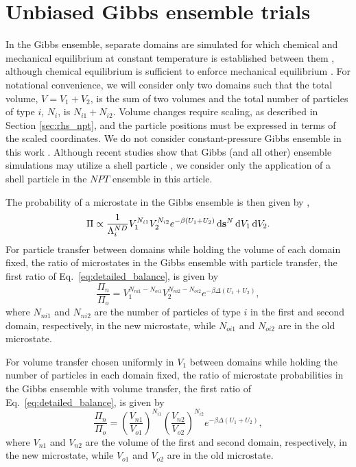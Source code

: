 \section{\label{sec:rhs_gibbs}Unbiased Gibbs ensemble trials}

In the Gibbs ensemble, separate domains are simulated for which chemical and mechanical equilibrium at constant temperature is established between them \cite{panagiotopoulos_direct_1987}, although chemical equilibrium is sufficient to enforce mechanical equilibrium \cite{panagiotopoulos_adsorption_1987}.
For notational convenience, we will consider only two domains such that the total volume, $V=V_1+V_2$, is the sum of two volumes and the total number of particles of type $i$, $N_i$, is $N_{i1} + N_{i2}$.
Volume changes require scaling, as described in Section \ref{sec:rhs_npt}, and the particle positions must be expressed in terms of the scaled coordinates.
We do not consider constant-pressure Gibbs ensemble in this work \cite{panagiotopoulos_phase_1988}.
Although recent studies show that Gibbs (and all other) ensemble simulations may utilize a shell particle \cite{hatch_theory_2024}, we consider only the application of a shell particle in the $NPT$ ensemble in this article.

The probability of a microstate in the Gibbs ensemble is then given by \cite{panagiotopoulos_direct_1987, frenkel_understanding_2002, hatch_theory_2024},
\begin{equation}
\Pi \propto \frac{1}{\Lambda_i^{ND}}V_1^{N_{i1}}V_2^{N_{i2}} e^{-\beta (U_1+U_2)} \mathop{}\!\mathrm{d}\mathbf{s}^{N} \mathop{}\!\mathrm{d} V_1 \mathop{}\!\mathrm{d} V_2.
\label{eq:rhs_gibbs_pi}
\end{equation}
For particle transfer between domains while holding the volume of each domain fixed, the ratio of microstates in the Gibbs ensemble with particle transfer, the first ratio of Eq.~\ref{eq:detailed_balance}, is given by
\begin{equation}
\frac{\Pi_{n}}{\Pi_{o}} = V_1^{N_{ni1}-N_{oi1}} V_2^{N_{ni2}-N_{oi2}}e^{-\beta\Delta (U_1+U_2)},
\label{eq:rhs_gibbs_particle}
\end{equation}
where $N_{ni1}$ and $N_{ni2}$ are the number of particles of type $i$ in the first and second domain, respectively, in the new microstate, while $N_{oi1}$ and $N_{oi2}$ are in the old microstate.

For volume transfer chosen uniformly in $V_1$ between domains while holding the number of particles in each domain fixed, the ratio of microstate probabilities in the Gibbs ensemble with volume transfer, the first ratio of Eq.~\ref{eq:detailed_balance}, is given by
\begin{equation}
\frac{\Pi_{n}}{\Pi_{o}} = \left(\frac{V_{n1}}{V_{o1}}\right)^{N_{i1}}\left(\frac{V_{n2}}{V_{o2}}\right)^{N_{i2}}e^{-\beta\Delta (U_1+U_2)},
\label{eq:rhs_gibbs_volume}
\end{equation}
where $V_{n1}$ and $V_{n2}$ are the volume of the first and second domain, respectively, in the new microstate, while $V_{o1}$ and $V_{o2}$ are in the old microstate.

